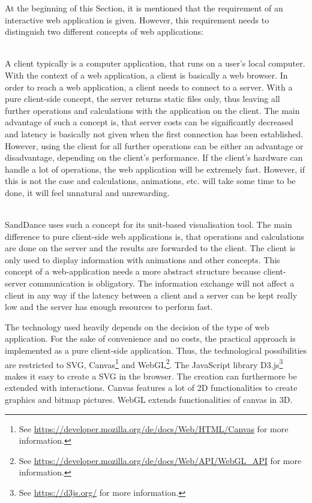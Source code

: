 At the beginning of this Section, it is mentioned that the requirement of an interactive web application is given. However, this requirement needs to distinguish two different concepts of web applications:
\begin{enumerate}

 \hfill \\
A client typically is a computer application, that runs on a user's local computer. With the context of a web application, a client is basically a web browser. In order to reach a web application, a client needs to connect to a server. With a pure client-side concept, the server returns static files only, thus leaving all further operations and calculations with the application on the client. The main advantage of such a concept is, that server costs can be significantly decreased and latency is basically not given when the first connection has been established. However, using the client for all further operations can be either an advantage or disadvantage, depending on the client's performance. If the client's hardware can handle a lot of operations, the web application will be extremely fast. However, if this is not the case and calculations, animations, etc. will take some time to be done, it will feel unnatural and unrewarding.

 \hfill \\
SandDance uses such a concept for its unit-based visualisation tool. The main difference to pure client-side web applications is, that operations and calculations are done on the server and the results are forwarded to the client. The client is only used to display information with animations and other concepts. This concept of a web-application needs a more abstract structure because client-server communication is obligatory. The information exchange will not affect a client in any way if the latency between a client and a server can be kept really low and the server has enough resources to perform fast.
\end{enumerate}

The technology used heavily depends on the decision of the type of web application. For the sake of convenience and no costs, the practical approach is implemented as a pure client-side application. Thus, the technological possibilities are restricted to \ac{SVG}, Canvas\footnote{See \href{https://developer.mozilla.org/de/docs/Web/HTML/Canvas}{https://developer.mozilla.org/de/docs/Web/HTML/Canvas} for more information.} and WebGL\footnote{See \href{https://developer.mozilla.org/de/docs/Web/API/WebGL_API}{https://developer.mozilla.org/de/docs/Web/API/WebGL\_API} for more information.}. The JavaScript library D3.js\footnote{See \href{https://d3js.org/}{https://d3js.org/} for more information.} makes it easy to create a \ac{SVG} in the browser. The creation can furthermore be extended with interactions. Canvas features a lot of 2D functionalities to create graphics and bitmap pictures. WebGL extends functionalities of canvas in 3D.